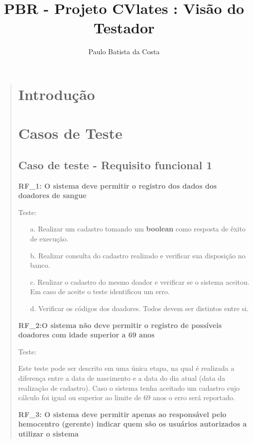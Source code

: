 \documentclass[12pt,a4paper]{report}
\author{Paulo Batista da Costa}
\title{PBR - Projeto CVlates : Visão do Testador}
\begin{document}
\maketitle
\tableofcontents
\begin{quotation}
\newpage
\section{Introdução}
\section{Casos de Teste}
\subsection{Caso de teste - Requisito funcional 1}

\textbf{RF\_1: O sistema deve permitir o registro dos dados dos doadores de sangue}

Teste:
\begin{itemize}
\item[a.] Realizar um cadastro tomando um \textbf{boolean} como resposta de êxito de execução.
\item[b.] Realizar consulta do cadastro realizado e verificar sua disposição no banco.
\item[c.] Realizar o cadastro do mesmo doador e verificar se o sistema aceitou. Em caso de aceite o teste identificou um erro. 
\item[d.] Verificar os códigos dos doadores. Todos devem ser distintos entre si. 
\end{itemize}
\textbf{RF\_2:O sistema não deve permitir o registro de possíveis doadores com idade superior a 69 anos}

Teste:

Este teste pode ser descrito em uma única etapa, na qual é realizada a diferença entre a data de nascimento e a data do dia atual (data da realização de cadastro). Caso o sistema tenha aceitado um cadastro cujo cálculo foi igual ou superior ao limite de 69 anos o erro será reportado.


\textbf{RF\_3: O sistema deve permitir apenas ao responsável pelo hemocentro (gerente) indicar quem são os usuários autorizados a utilizar o sistema}


\end{quotation}
\end{document}
